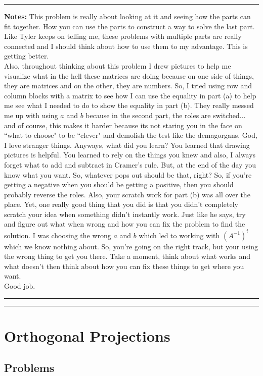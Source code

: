 \documentclass{article}
\begin{document}
\hrule 

\textbf{Notes:} This problem is really about looking at it and seeing how the parts can fit together. How you can use the parts to construct a way to solve the last part. Like Tyler keeps on telling me, these problems with multiple parts are really connected and I should think about how to use them to my advantage. This is getting better. \\

Also, throughout thinking about this problem I drew pictures to help me visualize what in the hell these matrices are doing because on one side of things, they are matrices and on the other, they are numbers. So, I tried using row and column blocks with a matrix to see how I can use the equality in part (a) to help me see what I needed to do to show the equality in part (b). They really messed me up with using $a$ and $b$ because in the second part, the roles are switched... and of course, this makes it harder because its not staring you in the face on ``what to choose" to be ``clever" and demolish the test like the demagorgans. God, I love stranger things. Anyways, what did you learn? You learned that drawing pictures is helpful. You learned to rely on the things you knew and also, I always forget what to add and subtract in Cramer's rule. But, at the end of the day you know what you want. So, whatever pops out should be that, right? So, if you're getting a negative when you should be getting a positive, then you should probably reverse the roles. Also, your scratch work for part (b) was all over the place. Yet, one really good thing that you did is that you didn't completely scratch your idea when something didn't instantly work. Just like he says, try and figure out what when wrong and how you can fix the problem to find the solution. I was choosing the wrong $a$ and $b$ which led to working with $(A^{-1})^t$ which we know nothing about. So, you're going on the right track, but your using the wrong thing to get you there. Take a moment, think about what works and what doesn't then think about how you can fix these things to get where you want.\\

Good job.\\

\hrule\vspace{2pt}
\hrule

\break

\section{Orthogonal Projections} 

\subsection{Problems}
\end{document}
